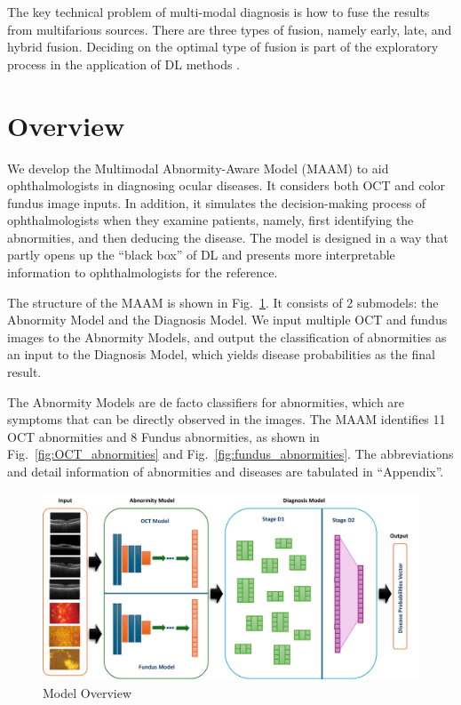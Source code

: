 \documentclass{article}
\begin{document}
\begin{multicols}{2}
	The key technical problem of multi-modal diagnosis is how to fuse the results from multifarious sources. There are three types of fusion, namely early, late, and hybrid fusion. Deciding on the optimal type of fusion is part of the exploratory process in the application of DL methods \autocite{Ichhpujani_Thakur_2021}.
	
	\section{Overview}
	\label{sec:overview}
	
	We develop the Multimodal Abnormity-Aware Model (MAAM) to aid ophthalmologists in diagnosing ocular diseases. It considers both OCT and color fundus image inputs. In addition, it simulates the decision-making process of ophthalmologists when they examine patients, namely, first identifying the abnormities, and then deducing the disease. The model is designed in a way that partly opens up the ``black box'' of DL and presents more interpretable information to ophthalmologists for the reference. 
	
	The structure of the MAAM is shown in Fig.~\ref{fig:3_parts}. It consists of 2 submodels: the Abnormity Model and the Diagnosis Model. We input multiple OCT and fundus images to the Abnormity Models, and output the classification of abnormities as an input to the Diagnosis Model, which yields disease probabilities as the final result.
	
	\vspace{0.5cm}
	
	The Abnormity Models are de facto classifiers for abnormities, which are symptoms that can be directly observed in the images. The MAAM identifies 11 OCT abnormities and 8 Fundus abnormities, as shown in Fig.~\ref{fig:OCT_abnormities} and Fig.~\ref{fig:fundus_abnormities}. The abbreviations and detail information of abnormities and diseases are tabulated in ``Appendix''.
	
	\end{multicols}

	\begin{figure}[htbp]
	\centering
	\includegraphics[width=\linewidth]{Figs/model_overview.pdf}
	\caption{Model Overview}
	\vspace{0.3cm}
	\label{fig:3_parts}
	\end{figure}
\end{document}
